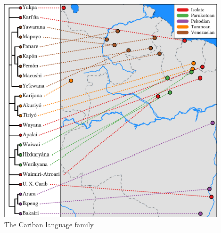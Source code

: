 \begin{figure}
	\centering
\includegraphics{floats/genealogical_map}
	\caption{The Cariban language family}
	\label{fig:phylomap}
\end{figure}